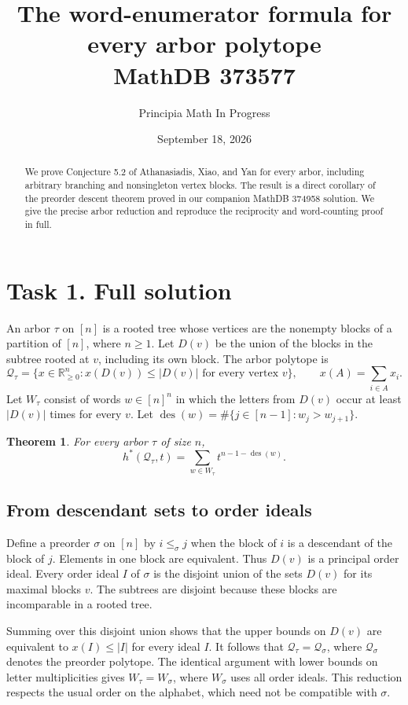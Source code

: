 \documentclass[11pt]{article}
\title{The word-enumerator formula for every arbor polytope\\\large MathDB 373577}
\author{Principia Math In Progress}
\date{September 18, 2026}
\newtheorem{theorem}{Theorem}
\newcommand{\Q}{\mathcal Q}
\newcommand{\des}{\operatorname{des}}
\begin{document}
\maketitle
\begin{abstract}
We prove Conjecture 5.2 of Athanasiadis, Xiao, and Yan for every arbor,
including arbitrary branching and nonsingleton vertex blocks. The result
is a direct corollary of the preorder descent theorem proved in our
companion MathDB 374958 solution. We give the precise arbor reduction
and reproduce the reciprocity and word-counting proof in full.
\end{abstract}

\section*{Task 1. Full solution}
An arbor $\tau$ on $[n]$ is a rooted tree whose vertices are the
nonempty blocks of a partition of $[n]$, where $n\ge1$.
Let $D(v)$ be the union of the blocks in the subtree rooted at $v$,
including its own block. The arbor polytope is
\[
 \Q_\tau=\{x\in\mathbb R_{\ge0}^n:x(D(v))\le |D(v)|
                             \text{ for every vertex $v$}\},
 \qquad x(A)=\sum_{i\in A}x_i.
\]
Let $W_\tau$ consist of words $w\in[n]^n$ in which the letters
from $D(v)$ occur at least $|D(v)|$ times for every $v$.
Let $\des(w)=\#\{j\in[n-1]:w_j>w_{j+1}\}$.
\begin{theorem}\label{thm:main}
For every arbor $\tau$ of size $n$,
\[
 \boxed{h^*(\Q_\tau,t)=\sum_{w\in W_\tau}t^{n-1-\des(w)}.}
\]
\end{theorem}

\subsection*{From descendant sets to order ideals}
Define a preorder $\sigma$ on $[n]$ by $i\le_\sigma j$ when
the block of $i$ is a descendant of the block of $j$. Elements
in one block are equivalent. Thus $D(v)$ is a principal order ideal.
Every order ideal $I$ of $\sigma$ is the disjoint union of the sets
$D(v)$ for its maximal blocks $v$. The subtrees are disjoint because
these blocks are incomparable in a rooted tree.

Summing over this disjoint union shows that the upper bounds on
$D(v)$ are equivalent to $x(I)\le |I|$ for every ideal $I$.
It follows that $\Q_\tau=\Q_\sigma$, where $\Q_\sigma$ denotes
the preorder polytope. The identical argument with lower bounds on
letter multiplicities gives $W_\tau=W_\sigma$, where $W_\sigma$
uses all order ideals. This reduction respects the usual order on
the alphabet, which need not be compatible with $\sigma$.
\end{document}
